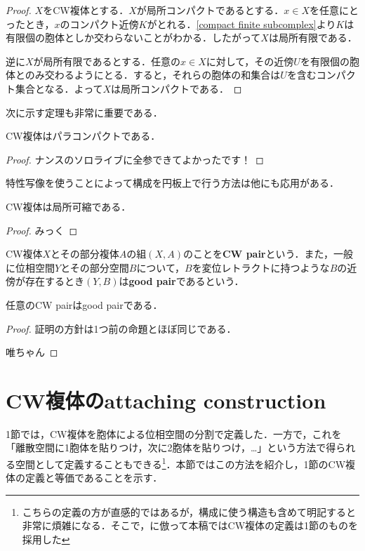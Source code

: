 \documentclass[uplatex]{jsarticle}
\begin{document}
\begin{proof}
  $X$をCW複体とする．$X$が局所コンパクトであるとする．$x\in X$を任意にとったとき，$x$のコンパクト近傍$K$がとれる．\cref{compact finite subcomplex}より$K$は有限個の胞体としか交わらないことがわかる．したがって$X$は局所有限である．

  逆に$X$が局所有限であるとする．任意の$x\in X$に対して，その近傍$U$を有限個の胞体とのみ交わるようにとる．すると，それらの胞体の和集合は$U$を含むコンパクト集合となる．よって$X$は局所コンパクトである．
\end{proof}

次に示す定理も非常に重要である．

\begin{theorem}
  CW複体はパラコンパクトである．
\end{theorem}

\begin{proof}
  ナンスのソロライブに全参できてよかったです！
\end{proof}

特性写像を使うことによって構成を円板上で行う方法は他にも応用がある．

\begin{proposition}
  CW複体は局所可縮である．
\end{proposition}

\begin{proof}
  みっく
\end{proof}

CW複体$X$とその部分複体$A$の組$(X,A)$のことを\textbf{CW pair}という．また，一般に位相空間$Y$とその部分空間$B$について，$B$を変位レトラクトに持つような$B$の近傍が存在するとき$(Y,B)$は\textbf{good pair}であるという．

\begin{proposition}
  任意のCW pairはgood pairである．
\end{proposition}

\begin{proof}
  証明の方針は1つ前の命題とほぼ同じである．

  唯ちゃん
\end{proof}

\section{CW複体のattaching construction}

1節では，CW複体を胞体による位相空間の分割で定義した．一方で，これを「離散空間に1胞体を貼りつけ，次に2胞体を貼りつけ，\dots」という方法で得られる空間として定義することもできる\footnote{こちらの定義の方が直感的ではあるが，構成に使う構造も含めて明記すると非常に煩雑になる．そこで，\cite{LeeSmooth}に倣って本稿ではCW複体の定義は1節のものを採用した}．本節ではこの方法を紹介し，1節のCW複体の定義と等価であることを示す．
\end{document}
